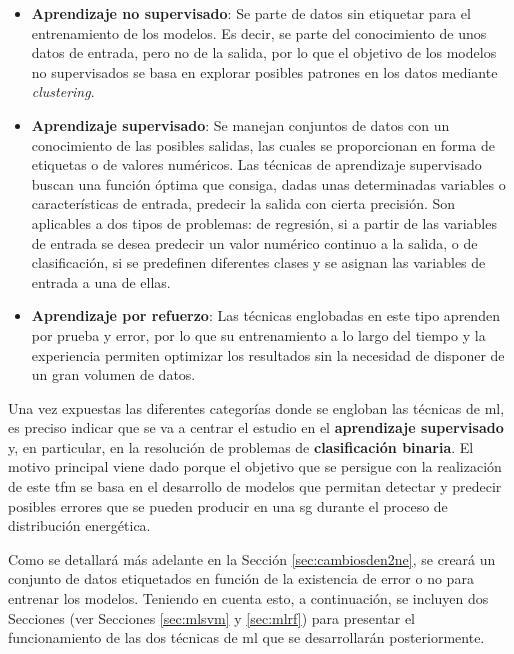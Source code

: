 \begin{itemize}
    \item \textbf{Aprendizaje no supervisado}: Se parte de datos sin etiquetar para el entrenamiento de los modelos. Es decir, se parte del conocimiento de unos datos de entrada, pero no de la salida, por lo que el objetivo de los modelos no supervisados se basa en explorar posibles patrones en los datos mediante \textit{clustering}.
    \item \textbf{Aprendizaje supervisado}: Se manejan conjuntos de datos con un conocimiento de las posibles salidas, las cuales se proporcionan en forma de etiquetas o de valores numéricos. Las técnicas de aprendizaje supervisado buscan una función óptima que consiga, dadas unas determinadas variables o características de entrada, predecir la salida con cierta precisión. Son aplicables a dos tipos de problemas: de regresión, si a partir de las variables de entrada se desea predecir un valor numérico continuo a la salida, o de clasificación, si se predefinen diferentes clases y se asignan las variables de entrada a una de ellas. 
    \item \textbf{Aprendizaje por refuerzo}: Las técnicas englobadas en este tipo aprenden por prueba y error, por lo que su entrenamiento a lo largo del tiempo y la experiencia permiten optimizar los resultados sin la necesidad de disponer de un gran volumen de datos.
\end{itemize}

Una vez expuestas las diferentes categorías donde se engloban las técnicas de \gls{ml}, es preciso indicar que se va a centrar el estudio en el \textbf{aprendizaje supervisado} y, en particular, en la resolución de problemas de \textbf{clasificación binaria}. El motivo principal viene dado porque el objetivo que se persigue con la realización de este \gls{tfm} se basa en el desarrollo de modelos que permitan detectar y predecir posibles errores que se pueden producir en una \gls{sg} durante el proceso de distribución energética. 

\vspace{3mm}

Como se detallará más adelante en la Sección \ref{sec:cambiosden2ne}, se creará un conjunto de datos etiquetados en función de la existencia de error o no para entrenar los modelos. Teniendo en cuenta esto, a continuación, se incluyen dos Secciones (ver Secciones \ref{sec:mlsvm} y \ref{sec:mlrf}) para presentar el funcionamiento de las dos técnicas de \gls{ml} que se desarrollarán posteriormente.


